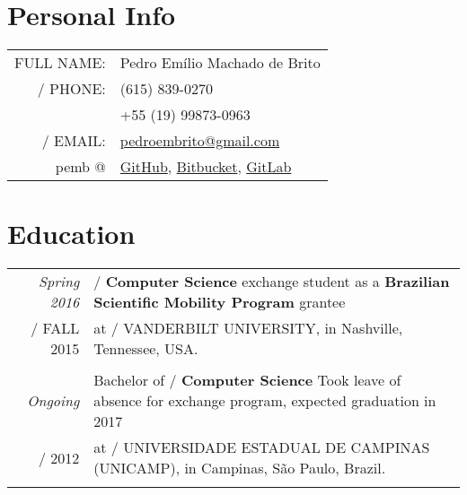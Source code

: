 \documentclass[a4paper,10pt]{article}
\makeatletter
\def\fakesc#1{%
  \begingroup%
  \xdef\fake@name{\csname\curr@fontshape/\f@size\endcsname}%
  \fontsize{\fontdimen8\fake@name}{\baselineskip}\selectfont%
  \uppercase{#1}%
  \endgroup%
}
\renewcommand{\textsc}{\fakesc}
\makeatother
\begin{document}
\pagestyle{empty} %

\par{\bigskip\par}

\section{Personal Info}

\begin{tabularx}{\textwidth}{ rl}
  \textsc{Full name:} & Pedro Emílio Machado de Brito \\
  \textsc{Phone:} & (615) 839-0270 \\
 & +55 (19) 99873-0963 \\
  \textsc{Email:} & \href{mailto:pedroembrito@gmail.com}{pedroembrito@gmail.com}\\
  \footnotesize{pemb @} & \href{https://github.com/pemb/}{GitHub}, \href{https://bitbucket.org/pemb}{Bitbucket}, \href{https://gitlab.com/pemb}{GitLab}\\
\end{tabularx}




\section{Education}

\begin{tabularx}{\textwidth}{r|X}	

  \emph{Spring 2016} & \textsc{}\textbf{Computer Science} exchange student as a \textbf{Brazilian Scientific Mobility Program} grantee  \\
  \textsc{Fall 2015} & at \textsc{Vanderbilt University,} \footnotesize{in Nashville, Tennessee, USA.}\\
  \multicolumn{2}{c}{}\\

  \emph{Ongoing} & Bachelor of \textsc{}\textbf{Computer Science} {\tiny Took leave of absence for exchange program, expected graduation in 2017} \\
  \textsc{2012} & at \textsc{Universidade Estadual de Campinas (Unicamp),} \footnotesize{in Campinas, São Paulo, Brazil.}\\
  \multicolumn{2}{c}{}\\

\end{tabularx}
\end{document}
